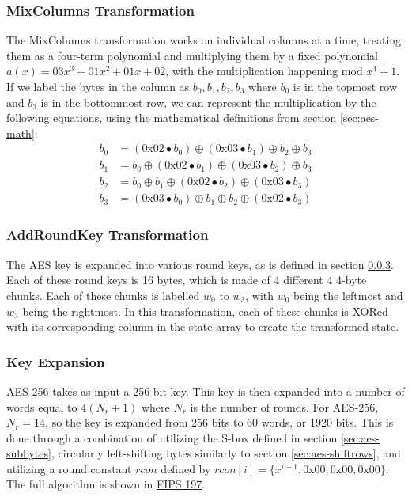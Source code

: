 		\subsubsection{MixColumns Transformation}\label{sec:aes-mixcols}
			The MixColumns transformation works on individual columns at a time, treating them as a four-term polynomial and multiplying them by a fixed polynomial 
			$a(x)=\text{03}x^3+\text{01}x^2+\text{01}x+\text{02}$, with the multiplication happening mod $x^4+1$. If we label the bytes in the column as $b_0,b_1,b_2,b_3$ where $b_0$ is in
			the topmost row and $b_3$ is in the bottommost row, we can represent the multiplication by the following equations, using the mathematical definitions from section \ref{sec:aes-math}:
			\begin{align*}
				b_0 &= (\text{0x02}\bullet b_0) \oplus (\text{0x03}\bullet b_1) \oplus b_2 \oplus b_3\\
				b_1 &= b_0 \oplus (\text{0x02}\bullet b_1) \oplus (\text{0x03}\bullet b_2) \oplus b_3\\
				b_2 &= b_0 \oplus b_1 \oplus (\text{0x02}\bullet b_2) \oplus (\text{0x03}\bullet b_3)\\
				b_3 &= (\text{0x03}\bullet b_0) \oplus b_1 \oplus b_2 \oplus (\text{0x02}\bullet b_3)
			\end{align*}   

		\subsubsection{AddRoundKey Transformation}\label{sec:aes-addround}
			The AES key is expanded into various round keys, as is defined in section \ref{sec:aes-keys}. Each of these round keys is 16 bytes, which is made of 4 different 4 4-byte chunks.
			Each of these chunks is labelled $w_0$ to $w_3$, with $w_0$ being the leftmost and $w_3$ being the rightmost. In this transformation, each of these chunks is XORed with its corresponding
			column in the state array to create the transformed state.
			
		\subsubsection{Key Expansion}\label{sec:aes-keys}
			AES-256 takes as input a 256 bit key. This key is then expanded into a number of words equal to $4(N_r+1)$ where $N_r$ is the number of rounds. For AES-256, $N_r=14$, so the key is
			expanded from 256 bits to 60 words, or 1920 bits. This is done through a combination of utilizing the S-box defined in section \ref{sec:aes-subbytes}, circularly left-shifting bytes
			similarly to section \ref{sec:aes-shiftrows}, and utilizing a round constant $rcon$ defined by $rcon[i]=\{x^{i-1}, \text{0x00}, \text{0x00}, \text{0x00}\}$. The full algorithm is
			shown in \href{https://nvlpubs.nist.gov/nistpubs/FIPS/NIST.FIPS.197.pdf}{FIPS 197}.

